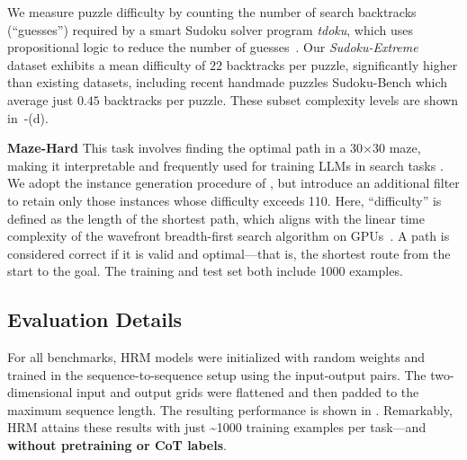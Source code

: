 

We measure puzzle difficulty by counting the number of search backtracks (``guesses'') required by a smart Sudoku solver program \textit{tdoku}, which uses propositional logic to reduce the number of guesses~\citep{tdoku}. Our \textit{Sudoku-Extreme} dataset exhibits a mean difficulty of $22$ backtracks per puzzle, significantly higher than existing datasets, including recent handmade puzzles Sudoku-Bench \citep{Seely2025SudokuBenchEC} which average just $0.45$ backtracks per puzzle. These subset complexity levels are shown in~-(d).

\textbf{Maze-Hard} This task involves finding the optimal path in a 30$\times$30 maze, making it interpretable and frequently used for training LLMs in search tasks \citep{Darlow2025ContinuousTM, dualformer2025, searchformer2024}. %
We adopt the instance generation procedure of \citet{searchformer2024}, but introduce an additional filter to retain only those instances whose difficulty exceeds 110. Here, ``difficulty'' is defined as the length of the shortest path, which aligns with the linear time complexity of the wavefront breadth-first search algorithm on GPUs~\citep{wavefrontBFS}. A path is considered correct if it is valid and optimal---that is, the shortest route from the start to the goal. The training and test set both include 1000 examples.

\subsection{Evaluation Details}

For all benchmarks, HRM models were initialized with random weights and trained in the sequence-to-sequence setup using the input-output pairs. The two-dimensional input and output grids were flattened and then padded to the maximum sequence length. The resulting performance is shown in . Remarkably, HRM attains these results with just \textasciitilde1000 training examples per task---and \textbf{without pretraining or CoT labels}.


